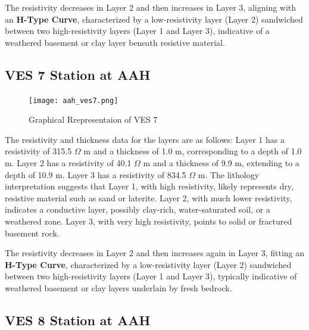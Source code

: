 \documentclass[12pt,a4paper]{report}
\begin{document}
The resistivity decreases in Layer 2 and then increases in Layer 3, aligning with an \textbf{H-Type Curve}, characterized by a low-resistivity layer (Layer 2) sandwiched between two high-resistivity layers (Layer 1 and Layer 3), indicative of a weathered basement or clay layer beneath resistive material.

\subsection{VES 7 Station at AAH}

\begin{figure}[H]
    \centering
    \texttt{[image: aah\_ves7.png]}
    \caption{Graphical Rrepresentaion of VES 7}
    \label{fig:AAH_VES_7_Curve}
\end{figure}
The resistivity and thickness data for the layers are as follows: Layer 1 has a resistivity of 315.5 $\Omega$ m and a thickness of 1.0 m, corresponding to a depth of 1.0 m. Layer 2 has a resistivity of 40.1 $\Omega$ m and a thickness of 9.9 m, extending to a depth of 10.9 m. Layer 3 has a resistivity of 834.5 $\Omega$ m. The lithology interpretation suggests that Layer 1, with high resistivity, likely represents dry, resistive material such as sand or laterite. Layer 2, with much lower resistivity, indicates a conductive layer, possibly clay-rich, water-saturated soil, or a weathered zone. Layer 3, with very high resistivity, points to solid or fractured basement rock.

The resistivity decreases in Layer 2 and then increases again in Layer 3, fitting an \textbf{H-Type Curve}, characterized by a low-resistivity layer (Layer 2) sandwiched between two high-resistivity layers (Layer 1 and Layer 3), typically indicative of weathered basement or clay layers underlain by fresh bedrock.

\subsection{VES 8 Station at AAH}
\end{document}
